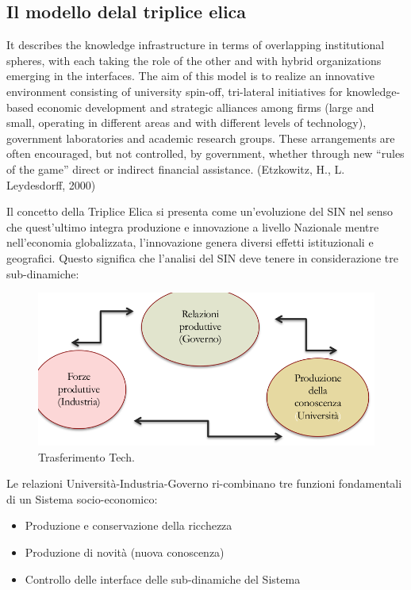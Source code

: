 \documentclass{article}
\begin{document}
\subsection{Il modello delal triplice elica}
It describes the knowledge infrastructure in terms of overlapping
institutional spheres, with each taking the role of the other and with hybrid
organizations emerging in the interfaces.
The aim of this model is to realize an innovative environment
consisting of university spin-off, tri-lateral initiatives for knowledge-
based economic development and strategic alliances among firms (large
and small, operating in different areas and with different levels of
technology), government laboratories and academic research groups.
These arrangements are often encouraged, but not controlled, by
government, whether through new “rules of the game” direct or
indirect financial assistance.
(Etzkowitz, H., L. Leydesdorff, 2000)

Il concetto della Triplice Elica si presenta come un’evoluzione del SIN
nel senso che quest’ultimo integra produzione e innovazione a livello
Nazionale mentre nell’economia globalizzata, l’innovazione genera
diversi effetti istituzionali e geografici.
Questo significa che l’analisi del SIN deve tenere in considerazione tre
sub-dinamiche:

\begin{figure}[h!]
	\centering
	\includegraphics[scale=0.3]{images/SIN.png}
	\caption{Trasferimento Tech.}
	\label{fig:ttf}
\end{figure} 

Le relazioni Università-Industria-Governo ri-combinano tre funzioni
fondamentali di un Sistema socio-economico:
\begin{itemize}
	\item Produzione e conservazione della ricchezza
	\item Produzione di novità (nuova conoscenza)
	\item Controllo delle interface delle sub-dinamiche del Sistema
\end{itemize}
\end{document}
